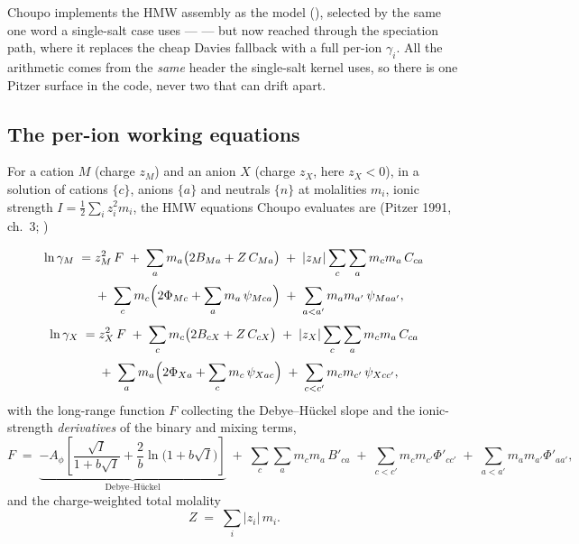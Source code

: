 \documentclass[11pt,a4paper]{article}
\begin{document}
Choupo implements the HMW assembly as the  
model (), selected by the same one word a single-salt
case uses ---  --- but now reached through the
speciation path, where it replaces the cheap Davies fallback with a full
per-ion $\gamma_i$.  All the arithmetic comes from the \emph{same}
 header the single-salt kernel uses, so there is one
Pitzer surface in the code, never two that can drift apart.

\subsection{The per-ion working equations}

For a cation $M$ (charge $z_M$) and an anion $X$ (charge $z_X$, here
$z_X<0$), in a solution of cations $\{c\}$, anions $\{a\}$ and neutrals
$\{n\}$ at molalities $m_i$, ionic strength
$I=\tfrac12\sum_i z_i^2 m_i$, the HMW equations Choupo evaluates are
(Pitzer 1991, ch.~3; \cite{HMW1984})

\begin{equation}
\begin{aligned}
   \ln\gamma_M \;=\;& z_M^2\,F
     \;+\; \sum_a m_a\bigl(2B_{Ma} + Z\,C_{Ma}\bigr)
     \;+\; |z_M|\sum_c\sum_a m_c m_a\,C_{ca} \\[2pt]
   &+\; \sum_{c} m_c\Bigl(2\Phi_{Mc} + \sum_a m_a\,\psi_{Mca}\Bigr)
     \;+\; \sum_{a<a'} m_a m_{a'}\,\psi_{Maa'},
\end{aligned}
   \label{eq:hmw-cation}
\end{equation}
\begin{equation}
\begin{aligned}
   \ln\gamma_X \;=\;& z_X^2\,F
     \;+\; \sum_c m_c\bigl(2B_{cX} + Z\,C_{cX}\bigr)
     \;+\; |z_X|\sum_c\sum_a m_c m_a\,C_{ca} \\[2pt]
   &+\; \sum_{a} m_a\Bigl(2\Phi_{Xa} + \sum_c m_c\,\psi_{Xac}\Bigr)
     \;+\; \sum_{c<c'} m_c m_{c'}\,\psi_{Xcc'},
\end{aligned}
   \label{eq:hmw-anion}
\end{equation}
with the long-range function $F$ collecting the Debye--H\"uckel slope and
the ionic-strength \emph{derivatives} of the binary and mixing terms,
\begin{equation}
   F \;=\;
   \underbrace{-A_\phi\!\left[\frac{\sqrt I}{1+b\sqrt I}
     + \frac{2}{b}\ln\!\bigl(1+b\sqrt I\bigr)\right]}_{\text{Debye--H\"uckel}}
   \;+\; \sum_c\sum_a m_c m_a\,B'_{ca}
   \;+\; \sum_{c<c'} m_c m_{c'}\Phi'_{cc'}
   \;+\; \sum_{a<a'} m_a m_{a'}\Phi'_{aa'},
   \label{eq:hmw-F}
\end{equation}
and the charge-weighted total molality
\begin{equation}
   Z \;=\; \sum_i |z_i|\,m_i .
   \label{eq:hmw-Z}
\end{equation}
\end{document}
